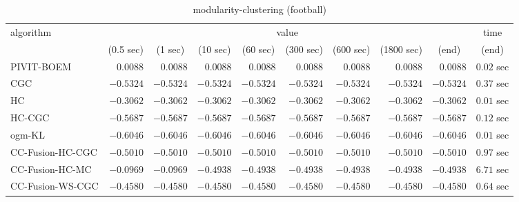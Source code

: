 \begin{table}[H]
\scriptsize
\centering
\caption{modularity-clustering (football)}
\label{tab:anytimetable-modularity-clustering-football}
\begin{tabular}{lrrrrrrrrr}
\toprule
           algorithm &                                   \multicolumn{8}{c}{value} & \multicolumn{1}{c}{time}   \\  
\cmidrule(lr){2-9}\cmidrule(lr){10-10}   
                     & \multicolumn{1}{c}{(0.5 sec)} & \multicolumn{1}{c}{(1 sec)} & \multicolumn{1}{c}{(10 sec)} & \multicolumn{1}{c}{(60 sec)} & \multicolumn{1}{c}{(300 sec)} & \multicolumn{1}{c}{(600 sec)} & \multicolumn{1}{c}{(1800 sec)} & \multicolumn{1}{c}{(end)} & \multicolumn{1}{c}{(end)}   \\ \midrule 
          PIVIT-BOEM & $       0.0088$ & $       0.0088$ & $       0.0088$ & $       0.0088$ & $       0.0088$ & $       0.0088$ & $       0.0088$ & $       0.0088$ & $         0.02$ sec   \\ 
                 CGC & $      -0.5324$ & $      -0.5324$ & $      -0.5324$ & $      -0.5324$ & $      -0.5324$ & $      -0.5324$ & $      -0.5324$ & $      -0.5324$ & $         0.37$ sec   \\ 
                  HC & $      -0.3062$ & $      -0.3062$ & $      -0.3062$ & $      -0.3062$ & $      -0.3062$ & $      -0.3062$ & $      -0.3062$ & $      -0.3062$ & $         0.01$ sec   \\ 
              HC-CGC & $      -0.5687$ & $      -0.5687$ & $      -0.5687$ & $      -0.5687$ & $      -0.5687$ & $      -0.5687$ & $      -0.5687$ & $      -0.5687$ & $         0.12$ sec   \\ 
              ogm-KL & $      -0.6046$ & $      -0.6046$ & $      -0.6046$ & $      -0.6046$ & $      -0.6046$ & $      -0.6046$ & $      -0.6046$ & $      -0.6046$ & $         0.01$ sec   \\ 
    CC-Fusion-HC-CGC & $      -0.5010$ & $      -0.5010$ & $      -0.5010$ & $      -0.5010$ & $      -0.5010$ & $      -0.5010$ & $      -0.5010$ & $      -0.5010$ & $         0.97$ sec   \\ 
     CC-Fusion-HC-MC & $      -0.0969$ & $      -0.0969$ & $      -0.4938$ & $      -0.4938$ & $      -0.4938$ & $      -0.4938$ & $      -0.4938$ & $      -0.4938$ & $         6.71$ sec   \\ 
    CC-Fusion-WS-CGC & $      -0.4580$ & $      -0.4580$ & $      -0.4580$ & $      -0.4580$ & $      -0.4580$ & $      -0.4580$ & $      -0.4580$ & $      -0.4580$ & $         0.64$ sec   \\ 

\end{tabular}
\end{table}
